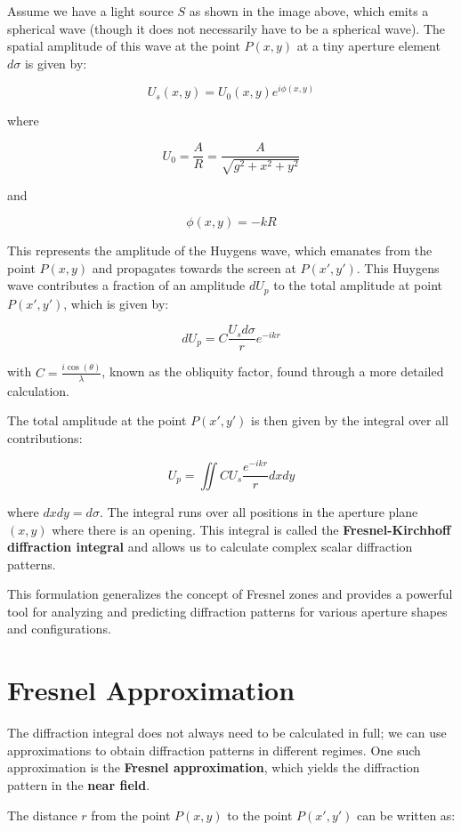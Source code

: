\documentclass[
  a4paper,
]{book}
\begin{document}
Assume we have a light source \(S\) as shown in the image above, which
emits a spherical wave (though it does not necessarily have to be a
spherical wave). The spatial amplitude of this wave at the point
\(P(x,y)\) at a tiny aperture element \(d\sigma\) is given by:

\[
U_s(x,y) = U_0(x,y)e^{i\phi(x,y)}
\]

where

\[
U_0 = \frac{A}{R} = \frac{A}{\sqrt{g^2 + x^2 + y^2}}
\]

and

\[
\phi(x,y) = -kR
\]

This represents the amplitude of the Huygens wave, which emanates from
the point \(P(x,y)\) and propagates towards the screen at \(P(x',y')\).
This Huygens wave contributes a fraction of an amplitude \(dU_p\) to the
total amplitude at point \(P(x',y')\), which is given by:

\[
dU_p = C \frac{U_s d\sigma}{r} e^{-ikr}
\]

with \(C = \frac{i \cos(\theta)}{\lambda}\), known as the obliquity
factor, found through a more detailed calculation.

The total amplitude at the point \(P(x',y')\) is then given by the
integral over all contributions:

\[
U_p = \iint C U_s \frac{e^{-ikr}}{r} dx dy
\]

where \(dx dy = d\sigma\). The integral runs over all positions in the
aperture plane \((x,y)\) where there is an opening. This integral is
called the \textbf{Fresnel-Kirchhoff diffraction integral} and allows us
to calculate complex scalar diffraction patterns.

This formulation generalizes the concept of Fresnel zones and provides a
powerful tool for analyzing and predicting diffraction patterns for
various aperture shapes and configurations.

\section{Fresnel Approximation}\label{fresnel-approximation}

The diffraction integral does not always need to be calculated in full;
we can use approximations to obtain diffraction patterns in different
regimes. One such approximation is the \textbf{Fresnel approximation},
which yields the diffraction pattern in the \textbf{near field}.

The distance \(r\) from the point \(P(x,y)\) to the point \(P(x',y')\)
can be written as:
\end{document}
